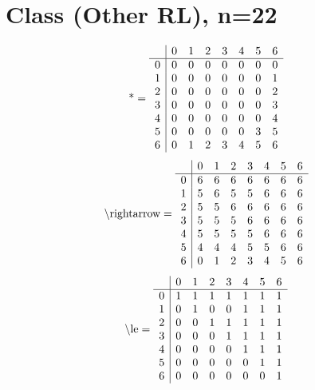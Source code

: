 \documentclass[11pt]{article}
\begin{document}
\section{Class (Other RL), n=22}
\[\text{*} = 
\begin{array}{r | r r r r r r r}
 & 0 & 1 & 2 & 3 & 4 & 5 & 6 \\ \hline
0 & 0 & 0 & 0 & 0 & 0 & 0 & 0 \\
1 & 0 & 0 & 0 & 0 & 0 & 0 & 1 \\
2 & 0 & 0 & 0 & 0 & 0 & 0 & 2 \\
3 & 0 & 0 & 0 & 0 & 0 & 0 & 3 \\
4 & 0 & 0 & 0 & 0 & 0 & 0 & 4 \\
5 & 0 & 0 & 0 & 0 & 0 & 3 & 5 \\
6 & 0 & 1 & 2 & 3 & 4 & 5 & 6 \\
\end{array}
\]
\[\text{\textbackslash rightarrow} = 
\begin{array}{r | r r r r r r r}
 & 0 & 1 & 2 & 3 & 4 & 5 & 6 \\ \hline
0 & 6 & 6 & 6 & 6 & 6 & 6 & 6 \\
1 & 5 & 6 & 5 & 5 & 6 & 6 & 6 \\
2 & 5 & 5 & 6 & 6 & 6 & 6 & 6 \\
3 & 5 & 5 & 5 & 6 & 6 & 6 & 6 \\
4 & 5 & 5 & 5 & 5 & 6 & 6 & 6 \\
5 & 4 & 4 & 4 & 5 & 5 & 6 & 6 \\
6 & 0 & 1 & 2 & 3 & 4 & 5 & 6 \\
\end{array}
\]
\[\text{\textbackslash le} = 
\begin{array}{r | r r r r r r r}
 & 0 & 1 & 2 & 3 & 4 & 5 & 6 \\ \hline
0 & 1 & 1 & 1 & 1 & 1 & 1 & 1 \\
1 & 0 & 1 & 0 & 0 & 1 & 1 & 1 \\
2 & 0 & 0 & 1 & 1 & 1 & 1 & 1 \\
3 & 0 & 0 & 0 & 1 & 1 & 1 & 1 \\
4 & 0 & 0 & 0 & 0 & 1 & 1 & 1 \\
5 & 0 & 0 & 0 & 0 & 0 & 1 & 1 \\
6 & 0 & 0 & 0 & 0 & 0 & 0 & 1 \\
\end{array}
\]
\end{document}
